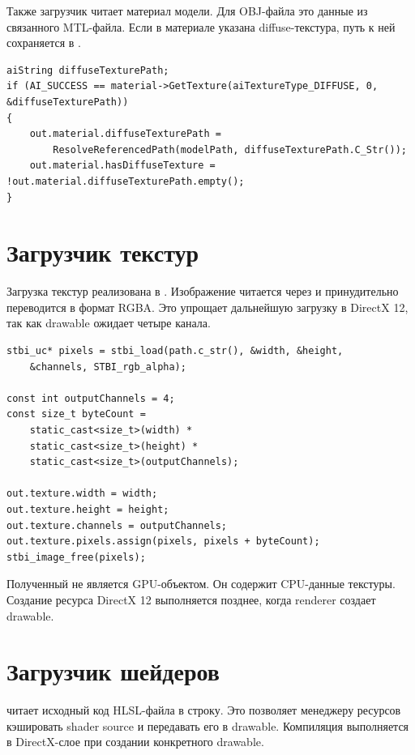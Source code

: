 \documentclass[14pt,a4paper]{extarticle}
\begin{document}
Также загрузчик читает материал модели. Для OBJ-файла это данные из связанного MTL-файла. Если в материале
указана diffuse-текстура, путь к ней сохраняется в .

\begin{lstlisting}[style=cppgost,caption={Получение diffuse-текстуры из материала Assimp}]
aiString diffuseTexturePath;
if (AI_SUCCESS == material->GetTexture(aiTextureType_DIFFUSE, 0, &diffuseTexturePath))
{
    out.material.diffuseTexturePath =
        ResolveReferencedPath(modelPath, diffuseTexturePath.C_Str());
    out.material.hasDiffuseTexture = !out.material.diffuseTexturePath.empty();
}
\end{lstlisting}

\section{Загрузчик текстур}

Загрузка текстур реализована в . Изображение читается через  и
принудительно переводится в формат RGBA. Это упрощает дальнейшую загрузку в DirectX 12, так как drawable
ожидает четыре канала.

\begin{lstlisting}[style=cppgost,caption={Загрузка изображения через stb\_image}]
stbi_uc* pixels = stbi_load(path.c_str(), &width, &height,
    &channels, STBI_rgb_alpha);

const int outputChannels = 4;
const size_t byteCount =
    static_cast<size_t>(width) *
    static_cast<size_t>(height) *
    static_cast<size_t>(outputChannels);

out.texture.width = width;
out.texture.height = height;
out.texture.channels = outputChannels;
out.texture.pixels.assign(pixels, pixels + byteCount);
stbi_image_free(pixels);
\end{lstlisting}

Полученный  не является GPU-объектом. Он содержит CPU-данные текстуры. Создание
ресурса DirectX 12 выполняется позднее, когда renderer создает drawable.

\section{Загрузчик шейдеров}

 читает исходный код HLSL-файла в строку. Это позволяет менеджеру ресурсов
кэшировать shader source и передавать его в drawable. Компиляция выполняется в DirectX-слое при создании
конкретного drawable.
\end{document}
